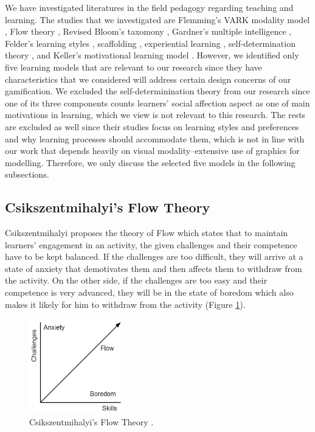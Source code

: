 \documentclass[12pt, a4paper]{report}
\begin{document}
We have investigated literatures in the field pedagogy regarding teaching and learning. The studies that we investigated are Flemming's VARK modality model \cite{fleming2006learning}, Flow theory \cite{csikszentmihalyi2014toward}, Revised Bloom's taxomony \cite{krathwohl2002revision}, Gardner's multiple intelligence \cite{gardner2011frames}, Felder's learning styles \cite{felder1988learning},  scaffolding \cite{wood1976role, vygotsky1978mind}, experiential learning \cite{kolb2014experiential}, self-determination theory \cite{ryan2000self}, and Keller's motivational learning model \cite{keller2010motivational}. However, we identified only five learning models that are relevant to our research since they have characteristics that we considered will address certain design concerns of our gamification. We excluded the self-determinination theory from our research since one of its three components counts learners' social affection aspect as one of main motivations in learning, which we view is not relevant to this research. The rests are excluded as well since their studies focus on learning styles and preferences and why learning processes should accommodate them, which is not in line with our work that depends heavily on visual modality--extensive use of graphics for modelling. Therefore, we only discuss the selected five models in the following subsections.

\subsection{Csikszentmihalyi's Flow Theory}
Csikszentmihalyi \cite{csikszentmihalyi2014toward} proposes the theory of Flow which states that to maintain learners' engagement in an activity, the given challenges and their competence have to be kept balanced. If the challenges are too difficult, they will arrive at a state of anxiety that demotivates them and then affects them to withdraw from the activity. On the other side, if the challenges are too easy and their competence is very advanced, they will be in the state of boredom which also makes it likely for him to withdraw from the activity (Figure \ref{flow-theory}).

\begin{figure}[ht]
\centering
\includegraphics[width=4cm]{flow-theory}
\caption{Csikszentmihalyi's Flow Theory \cite{csikszentmihalyi2014toward}.}
\label{flow-theory}
\end{figure}
 
\end{document}
